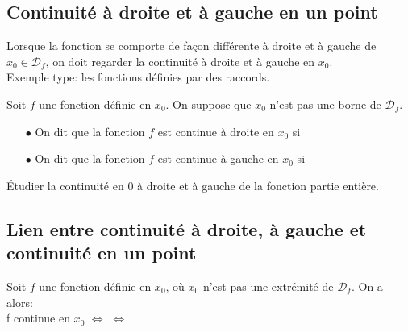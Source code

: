 \documentclass[a4paper, 11pt]{article}
\begin{document}
\subsection{Continuit\'e \`a droite et \`a gauche en un point}
\noindent Lorsque la fonction se comporte de fa\c{c}on diff\'erente \`{a} droite et \`{a} gauche de $x_0\in\mathcal{D}_f$, on doit regarder la continuit\'e \`{a} droite et \`{a} gauche en $x_0$.\\



Exemple type: les fonctions d\'efinies par des raccords.



\begin{defi}
	Soit $f$ une fonction d\'efinie en $x_0$. On suppose que $x_0$ n'est pas une borne de $\mathcal{D}_f$.\vsec
	\begin{itemize}
		\item[$\bullet$] On dit que la fonction $f$ est continue \`a droite en $x_0$ si \dotfill \vsec\vsec
		\item[$\bullet$]  On dit que la fonction $f$ est continue \`a gauche en $x_0$ si \dotfill \vsec\vsec
	\end{itemize}
\end{defi}




{\footnotesize \begin{exercice}
	\'Etudier la continuit\'e en $0$ \`{a} droite et \`{a} gauche de la fonction partie enti\`{e}re.
\end{exercice}}


\subsection{Lien entre continuit\'e \`a droite, \`a gauche et continuit\'e en un point}


\begin{prop}
	Soit $f$ une fonction d\'efinie en $x_0$, o\`u $x_0$ n'est pas une extr\'emit\'e de $\mathcal{D}_f$. On a alors:\vsec\vsec\\
	\noindent f continue en $x_0$ $\Longleftrightarrow $ \dotfill $\Longleftrightarrow $\dotfill\vsec\vsec
\end{prop}
\end{document}
